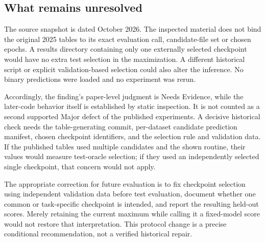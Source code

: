 \documentclass[10pt]{article}
\begin{document}
\subsection*{What remains unresolved}
The source snapshot is dated October 2026. The inspected material does not bind the original 2025 tables to its exact evaluation call, candidate-file set or chosen epochs. A results directory containing only one externally selected checkpoint would have no extra test selection in the maximization. A different historical script or explicit validation-based selection could also alter the inference. No binary predictions were loaded and no experiment was rerun.\par
Accordingly, the finding’s paper-level judgment is Needs Evidence, while the later-code behavior itself is established by static inspection. It is not counted as a second supported Major defect of the published experiments. A decisive historical check needs the table-generating commit, per-dataset candidate prediction manifest, chosen checkpoint identifiers, and the selection rule and validation data. If the published tables used multiple candidates and the shown routine, their values would measure test-oracle selection; if they used an independently selected single checkpoint, that concern would not apply.\par
The appropriate correction for future evaluation is to fix checkpoint selection using independent validation data before test evaluation, document whether one common or task-specific checkpoint is intended, and report the resulting held-out scores. Merely retaining the current maximum while calling it a fixed-model score would not restore that interpretation. This protocol change is a precise conditional recommendation, not a verified historical repair.\par
\end{document}
